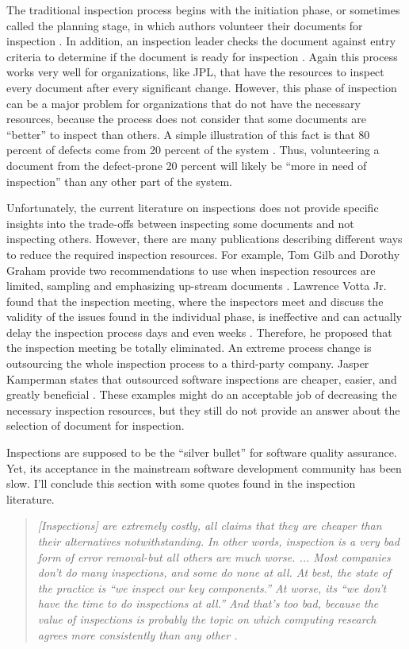 The traditional inspection process begins with the initiation phase, or
sometimes called the planning stage, in which authors volunteer their
documents for inspection \cite {Gilb93}. In addition, an inspection leader
checks the document against entry criteria to determine if the document is
ready for inspection \cite{Strauss94, Gilb93}. Again this process works
very well for organizations, like JPL, that have the resources to inspect
every document after every significant change. However, this phase of
inspection can be a major problem for organizations that do not have the
necessary resources, because the process does not consider that some
documents are ``better'' to inspect than others. A simple illustration of
this fact is that 80 percent of defects come from 20 percent of the system
\cite{Boehm01}. Thus, volunteering a document from the defect-prone 20
percent will likely be ``more in need of inspection'' than any other part
of the system.

Unfortunately, the current literature \cite{Strauss94, Wiegers02, Gilb93}
on inspections does not provide specific insights into the trade-offs
between inspecting some documents and not inspecting others. However, there
are many publications describing different ways to reduce the required
inspection resources. For example, Tom Gilb and Dorothy Graham provide two
recommendations to use when inspection resources are limited, sampling and
emphasizing up-stream documents \cite{Gilb93}. Lawrence Votta Jr. found
that the inspection meeting, where the inspectors meet and discuss the
validity of the issues found in the individual phase, is ineffective and
can actually delay the inspection process days and even weeks
\cite{Votta93, Glass99}. Therefore, he proposed that the inspection meeting
be totally eliminated. An extreme process change is outsourcing the whole
inspection process to a third-party company. Jasper Kamperman states that
outsourced software inspections are cheaper, easier, and greatly beneficial
\cite{Kamperman05}. These examples might do an acceptable job of decreasing
the necessary inspection resources, but they still do not provide an answer
about the selection of document for inspection.

Inspections are supposed to be the ``silver bullet'' for software quality
assurance. Yet, its acceptance in the mainstream software development
community has been slow. I'll conclude this section with some quotes found
in the inspection literature.

\begin{quotation}
  \textit{[Inspections] are extremely costly, all claims that they are
    cheaper than their alternatives notwithstanding. In other words,
    inspection is a very bad form of error removal-but all others are much
    worse. ... Most companies don't do many inspections, and some do none
    at all. At best, the state of the practice is ``we inspect our key
    components.'' At worse, its ``we don't have the time to do inspections
    at all.'' And that's too bad, because the value of inspections is
    probably the topic on which computing research agrees more consistently
    than any other \cite{Glass99}.}
\end{quotation}

